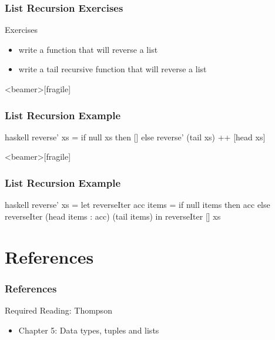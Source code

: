 \documentclass[dvipsnames]{beamer}
\theoremstyle{plain}
\begin{document}
\begin{frame}
  \frametitle{List Recursion Exercises}

  \begin{block}{Exercises}
    \begin{itemize}
      \item write a function that will reverse a list
      \item write a tail recursive function that will reverse a list
    \end{itemize}
  \end{block}
\end{frame}

\begin{frame}<beamer>[fragile]
  \frametitle{List Recursion Example}

  \begin{example}
    \begin{pygments}{haskell}
reverse' xs =
    if null xs
    then []
    else reverse' (tail xs) ++ [head xs]
    \end{pygments}
  \end{example}
\end{frame}

\begin{frame}<beamer>[fragile]
  \frametitle{List Recursion Example}

  \begin{example}
    \begin{pygments}{haskell}
reverse' xs =
    let
        reverseIter acc items =
            if null items
            then acc
            else reverseIter (head items : acc) (tail items)
    in
        reverseIter [] xs
    \end{pygments}
  \end{example}
\end{frame}

\section*{References}

\begin{frame}
  \frametitle{References}

  \begin{block}{Required Reading: Thompson}
    \begin{itemize}
      \item Chapter 5: \alert{Data types, tuples and lists}
    \end{itemize}
  \end{block}
\end{frame}
\end{document}
